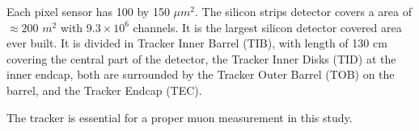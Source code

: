 Each pixel sensor has 100 by 150 $\mu m^2$. The silicon strips detector covers a area of $\approx \text{200 }m^2$ with $9.3 \times 10^6$ channels. It is the largest silicon detector covered area ever built. It is divided in Tracker Inner Barrel (TIB), with length of 130 cm covering the central part of the detector, the Tracker Inner Disks (TID) at the inner endcap, both are surrounded by the Tracker Outer Barrel (TOB) on the barrel, and the Tracker Endcap (TEC).

The tracker is essential for a proper muon measurement in this study.
